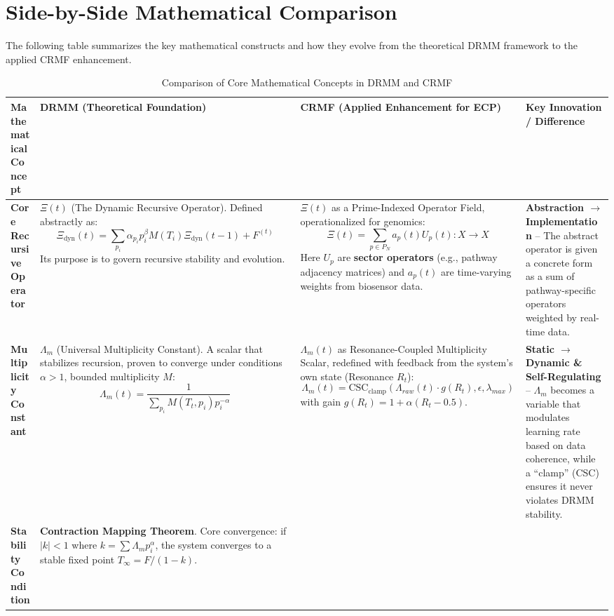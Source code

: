 \documentclass[12pt]{article}
\begin{document}
\section{Side-by-Side Mathematical Comparison}

The following table summarizes the key mathematical constructs and how they evolve from the theoretical DRMM framework to the applied CRMF enhancement.

\begin{table}[h!]
\centering
\caption{Comparison of Core Mathematical Concepts in DRMM and CRMF}
\label{tab:comparison}
\begin{tabular}{|p{3.2cm}|p{4cm}|p{4cm}|p{3cm}|}
\hline
\textbf{Mathematical Concept} & \textbf{DRMM (Theoretical Foundation)} & \textbf{CRMF (Applied Enhancement for ECP)} & \textbf{Key Innovation / Difference} \\
\hline
\textbf{Core Recursive Operator} & 
$\Xi(t)$ (The Dynamic Recursive Operator). Defined abstractly as:
\[
\Xi_{\mathrm{dyn}}(t) = \sum_{p_i}\alpha_{p_i} p_i^{\beta} M(T_i) \Xi_{\mathrm{dyn}}(t-1) + F^{(t)}
\]
Its purpose is to govern recursive stability and evolution. &
$\Xi(t)$ as a Prime-Indexed Operator Field, operationalized for genomics:
\[
\Xi(t) = \sum_{p\in P_N} a_p(t)U_p(t): X \to X
\]
Here $U_p$ are \textbf{sector operators} (e.g., pathway adjacency matrices) and $a_p(t)$ are time-varying weights from biosensor data. &
\textbf{Abstraction $\rightarrow$ Implementation} – The abstract operator is given a concrete form as a sum of pathway-specific operators weighted by real-time data. \\
\hline
\textbf{Multiplicity Constant} &
$\Lambda_m$ (Universal Multiplicity Constant). A scalar that stabilizes recursion, proven to converge under conditions $\alpha>1$, bounded multiplicity $M$:
\[
\Lambda_{m}(t) = \frac{1}{\sum_{p_i}M(T_t,p_i)p_i^{-\alpha}}
\]
&
$\Lambda_m(t)$ as Resonance-Coupled Multiplicity Scalar, redefined with feedback from the system’s own state (Resonance $R_t$):
\[
\Lambda_m(t) = \text{CSC}_{\text{clamp}}\left(\Lambda_{raw}(t) \cdot g(R_t), \epsilon, \lambda_{max}\right)
\]
with gain $g(R_t) = 1 + \alpha(R_t - 0.5)$. &
\textbf{Static $\rightarrow$ Dynamic \& Self-Regulating} – $\Lambda_m$ becomes a variable that modulates learning rate based on data coherence, while a “clamp” (CSC) ensures it never violates DRMM stability. \\
\hline
\textbf{Stability Condition} &
\textbf{Contraction Mapping Theorem}. Core convergence: if $|k|<1$ where $k = \sum \Lambda_m p_i^{\alpha}$, the system converges to a stable fixed point $T_{\infty}=F/(1-k)$. &

\end{tabular}
\end{table}
\end{document}
